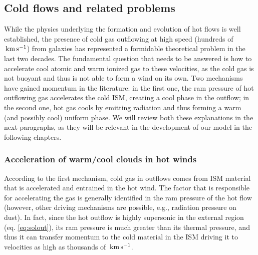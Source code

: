 \subsection{Cold flows and related problems}\label{sec:outflows_cooling}


While the physics underlying the formation and evolution of hot flows is well established, the presence of cold gas outflowing at high speed (hundreds of $\,\rm km\,s^{-1}$) from galaxies has represented a formidable theoretical problem in the last two decades. The fundamental question that needs to be answered is how to accelerate cool atomic and warm ionized gas to these velocities, as the cold gas is not buoyant and thus is not able to form a wind on its own. Two mechanisms have gained momentum in the literature: in the first one, the ram pressure of hot outflowing gas accelerates the cold ISM, creating a cool phase in the outflow; in the second one, hot gas cools by emitting radiation and thus forming a warm (and possibly cool) uniform phase. We will review both these explanations in the next paragraphs, as they will be relevant in the development of our model in the following chapters. 


\subsubsection{Acceleration of warm/cool clouds in hot winds}

According to the first mechanism, cold gas in outflows comes from ISM material that is accelerated and entrained in the hot wind. The factor that is responsible for accelerating the gas is generally identified in the ram pressure of the hot flow (however, other driving mechanisms are possible, e.g., radiation pressure on dust). In fact, since the hot outflow is highly supersonic in the external region (eq. \ref{eq:solout}), its ram pressure is much greater than its thermal pressure, and thus it can transfer momentum to the cold material in the ISM driving it to velocities as high as thousands of $\,\rm km\,s^{-1}$. 

